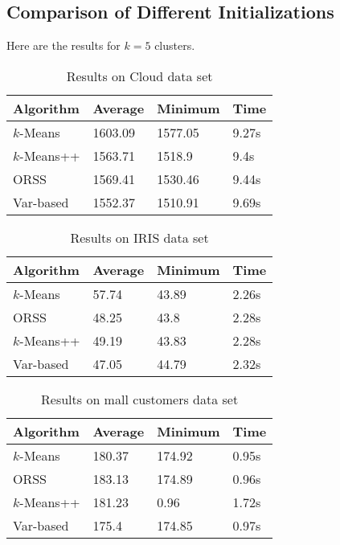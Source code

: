 \documentclass[twoside, 11pt]{article}
\begin{document}
	\subsection{Comparison of Different Initializations}
	Here are the results for $k=5$ clusters.
		\begin{table}[h]
			\begin{center}
				\begin{tabular}{|l|l|l|l|}
					\hline
					Algorithm & Average & Minimum & Time\\\hline
					$k$-Means & 1603.09& 1577.05& 9.27s\\\hline
					$k$-Means++ & 1563.71& 1518.9& 9.4s\\\hline
					ORSS & 1569.41& 1530.46& 9.44s\\\hline
					Var-based & 1552.37& 1510.91& 9.69s\\\hline
				\end{tabular}
			\caption{Results on Cloud data set}
			\end{center}
		\label{tbl:cloud}
		\end{table}
	
		\begin{table}[h]
			\begin{center}
				\begin{tabular}{|l|l|l|l|}
					\hline
					Algorithm & Average & Minimum & Time\\\hline
					$k$-Means & 57.74& 43.89& 2.26s\\\hline
					ORSS & 48.25& 43.8& 2.28s\\\hline
					$k$-Means++ & 49.19& 43.83& 2.28s\\\hline
					Var-based & 47.05& 44.79& 2.32s\\\hline
				\end{tabular}
				\caption{Results on IRIS data set}
			\end{center}
			\label{tbl:iris}
		\end{table}

		\begin{table}[h]
			\begin{center}
				\begin{tabular}{|l|l|l|l|}
					\hline
					Algorithm & Average & Minimum & Time\\\hline
					$k$-Means & 180.37& 174.92& 0.95s\\\hline
					ORSS & 183.13& 174.89& 0.96s\\\hline
					$k$-Means++ & 181.23& 0.96& 1.72s\\\hline
					Var-based & 175.4& 174.85& 0.97s\\\hline
				\end{tabular}
				\caption{Results on mall customers data set}
			\end{center}
			\label{tbl:mall}
		\end{table}
\end{document}
